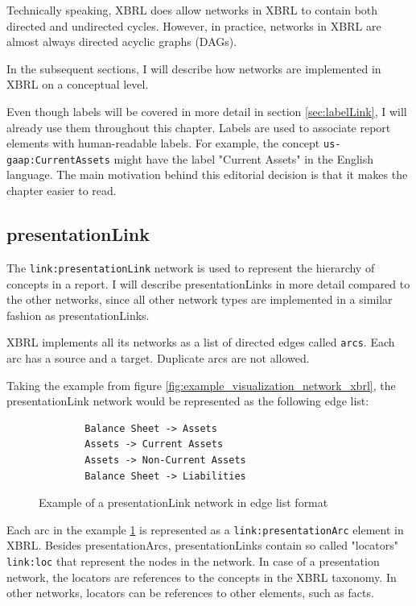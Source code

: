 Technically speaking, XBRL does allow networks in XBRL to contain both directed and undirected cycles.
However, in practice, networks in XBRL are almost always directed acyclic graphs (DAGs).

In the subsequent sections, I will describe how networks are implemented in XBRL on a conceptual level. 

Even though labels will be covered in more detail in section \ref{sec:labelLink}, I will already use them throughout this chapter.
Labels are used to associate report elements with human-readable labels.
For example, the concept \texttt{us-gaap:CurrentAssets} might have the label "Current Assets" in the English language.
The main motivation behind this editorial decision is that it makes the chapter easier to read.



\subsection{presentationLink}

The \texttt{link:presentationLink} network is used to represent the hierarchy of concepts in a report.
I will describe presentationLinks in more detail compared to the other networks, 
since all other network types are implemented in a similar fashion as presentationLinks.

XBRL implements all its networks as a list of directed edges called \texttt{arcs}.
Each arc has a source and a target. Duplicate arcs are not allowed.

Taking the example from figure \ref{fig:example_visualization_network_xbrl}, the presentationLink network would be represented as the following edge list:

\begin{figure}[H]
    \caption{Example of a presentationLink network in edge list format}
    \label{fig:example_visualization_network_xbrl_edge_list}
    \begin{verbatim}
        Balance Sheet -> Assets
        Assets -> Current Assets
        Assets -> Non-Current Assets
        Balance Sheet -> Liabilities
    \end{verbatim}
\end{figure}

Each arc in the example \ref{fig:example_visualization_network_xbrl_edge_list} is represented as a \texttt{link:presentationArc} element in XBRL.
Besides presentationArcs, presentationLinks contain so called "locators" \texttt{link:loc} that represent the nodes in the network.
In case of a presentation network, the locators are references to the concepts in the XBRL taxonomy. 
In other networks, locators can be references to other elements, such as facts.

